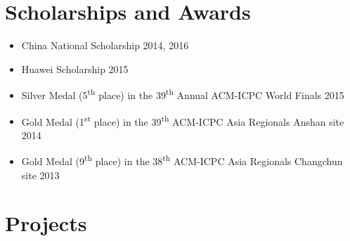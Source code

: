\documentclass[11pt,letterpaper,roman]{moderncv}        %
\begin{document}
\section{Scholarships and Awards}

\begin{itemize}
\item China National Scholarship \hfill 2014, 2016
\item Huawei Scholarship \hfill 2015

  \vspace{4pt}

  \item Silver Medal (5\textsuperscript{th} place) in the 39\textsuperscript{th} Annual ACM-ICPC World Finals \hfill 2015
  \item Gold Medal (1\textsuperscript{st} place) in the 39\textsuperscript{th} ACM-ICPC Asia Regionals Anshan site \hfill 2014
  \item Gold Medal (9\textsuperscript{th} place) in the 38\textsuperscript{th} ACM-ICPC Asia Regionals Changchun site \hfill 2013
\end{itemize}

\section{Projects}
\end{document}

